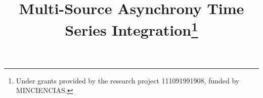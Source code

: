 \usepackage{amsmath,amssymb,amsthm}
\usepackage{xcolor}
\usepackage{subcaption, caption}
\usepackage{tikz}
\usepackage{pgfplots}
\usepackage{lineno}
\usepackage[capitalise,noabbrev]{cleveref}

\pgfplotsset{compat=1.18}
\linenumbers

\title{Multi-Source Asynchrony Time Series Integration\thanks{Under grants provided by the research project 111091991908, funded by MINCIENCIAS.}}

\date{}